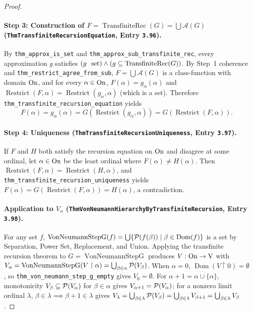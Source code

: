\begin{proof}
\paragraph{Step 3: Construction of $F = \operatorname{TransfiniteRec}(G) = \bigcup \mathcal{A}(G)$ (\texttt{ThmTransfiniteRecursionEquation}, Entry \texttt{3.96}).}
By \texttt{thm\_approx\_is\_set} and \texttt{thm\_approx\_sub\_transfinite\_rec}, every approximation $g$ satisfies $(g\ \mathrm{\ set}) \land (g \subseteq \operatorname{TransfiniteRec}(G))$. By Step~1 coherence and \texttt{thm\_restrict\_agree\_from\_sub}, $F = \bigcup \mathcal{A}(G)$ is a class-function with domain $\mathrm{On}$, and for every $\alpha \in \mathrm{On}$, $F(\alpha) = g_\alpha(\alpha)$ and $\operatorname{Restrict}(F, \alpha) = \operatorname{Restrict}(g_\alpha, \alpha)$ (which is a set). Therefore \texttt{thm\_transfinite\_recursion\_equation} yields
\[
F(\alpha) = g_\alpha(\alpha) = G(\operatorname{Restrict}(g_\alpha, \alpha)) = G(\operatorname{Restrict}(F, \alpha)).
\]

\paragraph{Step 4: Uniqueness (\texttt{ThmTransfiniteRecursionUniqueness}, Entry \texttt{3.97}).}
If $F$ and $H$ both satisfy the recursion equation on $\mathrm{On}$ and disagree at some ordinal, let $\alpha \in \mathrm{On}$ be the least ordinal where $F(\alpha) \neq H(\alpha)$. Then $\operatorname{Restrict}(F, \alpha) = \operatorname{Restrict}(H, \alpha)$, and \texttt{thm\_transfinite\_recursion\_uniqueness} yields $F(\alpha) = G(\operatorname{Restrict}(F, \alpha)) = H(\alpha)$, a contradiction.

\paragraph{Application to $V_\alpha$ (\texttt{ThmVonNeumannHierarchyByTransfiniteRecursion}, Entry \texttt{3.98}).}
For any set $f$, $\operatorname{VonNeumannStepG}(f) = \bigcup \{\mathcal{P}(f(\beta)) \mid \beta \in \operatorname{Dom}(f)\}$ is a set by Separation, Power Set, Replacement, and Union. Applying the transfinite recursion theorem to $G = \operatorname{VonNeumannStepG}$ produces $V : \mathrm{On} \to \mathrm{V}$ with $V_\alpha = \operatorname{VonNeumannStepG}(V \upharpoonright \alpha) = \bigcup_{\beta \in \alpha} \mathcal{P}(V_\beta)$. When $\alpha = 0$, $\operatorname{Dom}(V \upharpoonright 0) = \emptyset$, so \texttt{thm\_von\_neumann\_step\_g\_empty} gives $V_0 = \emptyset$. For $\alpha + 1 = \alpha \cup \{\alpha\}$, monotonicity $V_\beta \subseteq \mathcal{P}(V_\alpha)$ for $\beta \in \alpha$ gives $V_{\alpha+1} = \mathcal{P}(V_\alpha)$; for a nonzero limit ordinal $\lambda$, $\beta \in \lambda \implies \beta + 1 \in \lambda$ gives $V_\lambda = \bigcup_{\beta \in \lambda} \mathcal{P}(V_\beta) = \bigcup_{\beta \in \lambda} V_{\beta+1} = \bigcup_{\beta \in \lambda} V_\beta$.
\end{proof}


